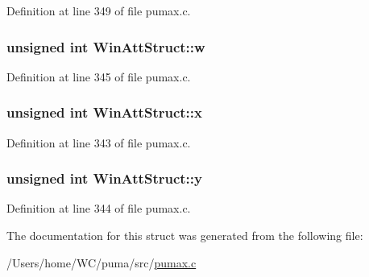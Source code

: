 \-Definition at line 349 of file pumax.\-c.

\hypertarget{struct_win_att_struct_a6e7f8041c23d41b7d2835a2b855d35f0}{
\subsubsection[{w}]{\setlength{\rightskip}{0pt plus 5cm}unsigned int {\bf \-Win\-Att\-Struct\-::w}}}
\label{struct_win_att_struct_a6e7f8041c23d41b7d2835a2b855d35f0}


\-Definition at line 345 of file pumax.\-c.

\hypertarget{struct_win_att_struct_aa00d94640c9eb39ceac56f95c595f62a}{
\subsubsection[{x}]{\setlength{\rightskip}{0pt plus 5cm}unsigned int {\bf \-Win\-Att\-Struct\-::x}}}
\label{struct_win_att_struct_aa00d94640c9eb39ceac56f95c595f62a}


\-Definition at line 343 of file pumax.\-c.

\hypertarget{struct_win_att_struct_a770cabf1d350db5890f636ccf30e5d47}{
\subsubsection[{y}]{\setlength{\rightskip}{0pt plus 5cm}unsigned int {\bf \-Win\-Att\-Struct\-::y}}}
\label{struct_win_att_struct_a770cabf1d350db5890f636ccf30e5d47}


\-Definition at line 344 of file pumax.\-c.



\-The documentation for this struct was generated from the following file\-:\begin{DoxyCompactItemize}
\item 
/\-Users/home/\-W\-C/puma/src/\hyperlink{pumax_8c}{pumax.\-c}\end{DoxyCompactItemize}
